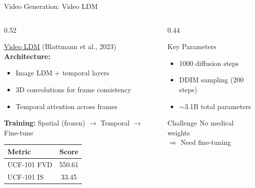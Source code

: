 \documentclass[aspectratio=169,xcolor=dvipsnames]{beamer}
\begin{document}
\begin{frame}{Video Generation: Video LDM}
    \begin{columns}
        \begin{column}{0.52\textwidth}
            \begin{block}{\href{https://arxiv.org/abs/2304.08818}{Video LDM} (Blattmann et al., 2023)}
                \small
                \textbf{Architecture:}
                \begin{itemize}\setlength{\itemsep}{1pt}
                    \item Image LDM + temporal layers
                    \item 3D convolutions for frame consistency
                    \item Temporal attention across frames
                \end{itemize}
                
                \textbf{Training:} Spatial (frozen) $\to$ Temporal $\to$ Fine-tune
            \end{block}
            
            \begin{table}
                \centering
                \footnotesize
                \begin{tabular}{lc}
                    \toprule
                    \textbf{Metric} & \textbf{Score} \\
                    \midrule
                    UCF-101 FVD & 550.61 \\
                    UCF-101 IS & 33.45 \\
                    \bottomrule
                \end{tabular}
            \end{table}
        \end{column}
        
        \begin{column}{0.44\textwidth}
            \begin{block}{Key Parameters}
                \small
                \begin{itemize}\setlength{\itemsep}{1pt}
                    \item 1000 diffusion steps
                    \item DDIM sampling (200 steps)
                    \item $\sim$3.1B total parameters
                \end{itemize}
            \end{block}
            
            \begin{alertblock}{Challenge}
                \small \textcolor{red}{} No medical weights\\
                $\Rightarrow$ Need fine-tuning
            \end{alertblock}
        \end{column}
    \end{columns}
\end{frame}
\end{document}
